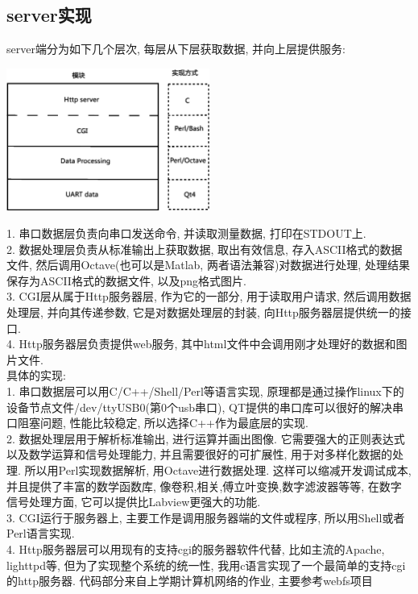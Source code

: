 \documentclass{article}
\begin{document}
\subsection{server实现}
server端分为如下几个层次, 每层从下层获取数据, 并向上层提供服务:\\
\begin{center}
\includegraphics[width=0.5\textwidth]{image/server.eps}\\[2em]
\end{center}
1. 串口数据层负责向串口发送命令, 并读取测量数据, 打印在STDOUT上.\\
2. 数据处理层负责从标准输出上获取数据, 取出有效信息, 存入ASCII格式的数据文件, 然后调用Octave(也可以是Matlab, 两者语法兼容)对数据进行处理, 处理结果保存为ASCII格式的数据文件, 以及png格式图片.\\
3. CGI层从属于Http服务器层, 作为它的一部分, 用于读取用户请求, 然后调用数据处理层, 并向其传递参数, 它是对数据处理层的封装, 向Http服务器层提供统一的接口.\\
4. Http服务器层负责提供web服务, 其中html文件中会调用刚才处理好的数据和图片文件.\\[2em]
具体的实现:\\
1. 串口数据层可以用C/C++/Shell/Perl等语言实现, 原理都是通过操作linux下的设备节点文件/dev/ttyUSB0(第0个usb串口), QT提供的串口库可以很好的解决串口阻塞问题, 性能比较稳定, 所以选择C++作为最底层的实现.\\
2. 数据处理层用于解析标准输出, 进行运算并画出图像. 它需要强大的正则表达式以及数学运算和信号处理能力, 并且需要很好的可扩展性, 用于对多样化数据的处理. 所以用Perl实现数据解析, 用Octave进行数据处理. 这样可以缩减开发调试成本, 并且提供了丰富的数学函数库, 像卷积,相关,傅立叶变换,数字滤波器等等, 在数字信号处理方面, 它可以提供比Labview更强大的功能.\\
3. CGI运行于服务器上, 主要工作是调用服务器端的文件或程序, 所以用Shell或者Perl语言实现.\\
4. Http服务器层可以用现有的支持cgi的服务器软件代替, 比如主流的Apache, lighttpd等, 但为了实现整个系统的统一性, 我用c语言实现了一个最简单的支持cgi的http服务器. 代码部分来自上学期计算机网络的作业, 主要参考webfs\cite{webfs}项目\\
\end{document}
